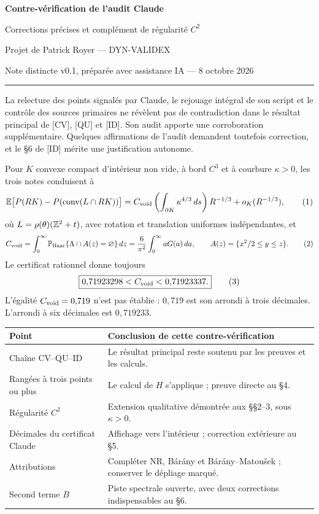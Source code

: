 \documentclass[11pt,a4paper]{article}
\newcommand{\E}{\mathbb E}\newcommand{\Prb}{\mathbb P}
\newcommand{\head}[1]{\vspace{3pt}{\large\bfseries\color{navy}#1}\par}
\begin{document}
{\LARGE\bfseries\color{navy}Contre-vérification de l'audit Claude}\par
{\large Corrections précises et complément de régularité $C^2$}\par
Projet de Patrick Royer --- DYN-VALIDEX\par
Note distincte v0.1, préparée avec assistance IA --- 8 octobre 2026\par
\vspace{3pt}\hrule\vspace{6pt}

\head{1. Verdict et portée}
La relecture des points signalés par Claude, le rejouage intégral de son script et le contrôle des sources primaires ne révèlent pas de contradiction dans le résultat principal de [CV], [QU] et [ID]. Son audit apporte une corroboration supplémentaire. Quelques affirmations de l'audit demandent toutefois correction, et le §6 de [ID] mérite une justification autonome.

Pour $K$ convexe compact d'intérieur non vide, à bord $C^3$ et à courbure $\kappa>0$, les trois notes conduisent à
\[
 \E\bigl[P(RK)-P(\operatorname{conv}(L\cap RK))\bigr]
 =C_{\rm void}\left(\int_{\partial K}\kappa^{4/3}\,ds\right)R^{-1/3}
 +o_K(R^{-1/3}),\tag{1}
\]
où $L=\rho(\theta)(\mathbb Z^2+t)$, avec rotation et translation uniformes indépendantes, et
\[
 C_{\rm void}=\int_0^\infty\Prb_{\rm Haar}\{\Lambda\cap A(z)=\varnothing\}\,dz
 =\frac6{\pi^2}\int_0^\infty aG(a)\,da,\qquad
 A(z)=\{x^2/2\le y\le z\}.\tag{2}
\]
Le certificat rationnel donne toujours
\[
 \boxed{0{,}71923298<C_{\rm void}<0{,}71923337.}\tag{3}
\]
L'égalité $C_{\rm void}=0{,}719$ n'est pas établie : $0{,}719$ est son arrondi à trois décimales. L'arrondi à six décimales est $0{,}719233$.

\begin{tabularx}{\textwidth}{@{}lX@{}}\toprule
Point & Conclusion de cette contre-vérification\\\midrule
Chaîne CV--QU--ID & Le résultat principal reste soutenu par les preuves et les calculs.\\
Rangées à trois points ou plus & Le calcul de $H$ s'applique ; preuve directe au §4.\\
Régularité $C^2$ & Extension qualitative démontrée aux §§2--3, sous $\kappa>0$.\\
Décimales du certificat Claude & Affichage vers l'intérieur ; correction extérieure au §5.\\
Attributions & Compléter NR, Bárány et Bárány--Matoušek ; conserver le dépliage marqué.\\
Second terme $B$ & Piste spectrale ouverte, avec deux corrections indispensables au §6.\\\bottomrule
\end{tabularx}
\end{document}
